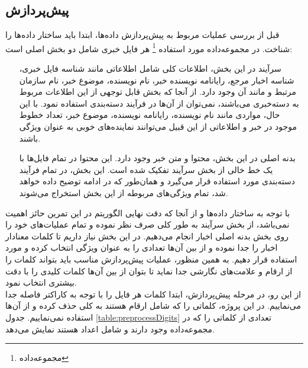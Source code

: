 \documentclass[11.5pt,a4paper]{article}
\begin{document}
\subsection{پیش‌پردازش}
قبل از بررسی عملیات مربوط به پیش‌پردازش داده‌ها،‌ ابتدا باید ساختار داده‌ها را شناخت. در مجموعه‌داده مورد استفاده
\footnote{مجموعه‌داده 
 }
 هر فایل خبری شامل دو بخش اصلی است:
\begin{itemize}
\item [سرآیند] 
در این بخش، اطلاعات کلی شامل اطلاعاتی مانند شناسه فایل خبری، شناسه اخبار مرجع، رایانامه نویسنده خبر، نام نویسنده،‌ موضوع خبر،‌ نام سازمان مرتبط و مانند آن وجود دارد. از آنجا که بخش قابل توجهی از این اطلاعات مربوط به دسته‌خبری می‌باشند، نمی‌توان از آن‌ها در فرآیند دسته‌بندی استفاده نمود. با این حال، مواردی مانند نام نویسنده، رایانامه نویسنده، موضوع خبر، تعداد خطوط موجود در خبر و اطلاعاتی از این قبیل می‌توانند نماینده‌های خوبی به عنوان ویژگی باشند.
\item [بدنه اصلی]
در این بخش، محتوا و متن خبر وجود دارد. این محتوا در تمام فایل‌ها با یک خط خالی از بخش سرآیند تفکیک شده است. این بخش، در تمام فرآیند دسته‌بندی مورد استفاده قرار می‌گیرد و همان‌طور که در ادامه توضیح داده خواهد شد، تمام ویژگی‌های مربوطه از این بخش استخراج می‌شوند.
\end{itemize}

با توجه به ساختار داده‌ها و از آنجا که دقت نهایی الگوریتم در این تمرین حائز اهمیت نمی‌باشد،‌ از بخش سرآیند به طور کلی صرف نظر نموده و تمام عملیات‌های خود را روی بخش بدنه اصلی اخبار انجام می‌دهیم. در این بخش نیاز داریم تا کلمات معنادار اخبار را جدا نموده و از بین آن‌ها تعدادی را به عنوان ویژگی انتخاب کرده و مورد استفاده قرار دهیم. به همین منظور، عملیات پیش‌پردازش مناسب باید بتواند کلمات را از ارقام و علامت‌های نگارشی جدا نماید تا بتوان از بین آن‌ها کلمات کلیدی را با دقت بیشتری انتخاب نمود.\\
از این رو، در مرحله پیش‌پردازش، ابتدا کلمات هر فایل را با توجه به کاراکتر فاصله جدا می‌نماییم. در این پروژه، کلماتی را که شامل ارقام هستند به کلی حذف کرده و از آن‌ها استفاده نمی‌نماییم. جدول \ref{table:preprocessDigits} تعدادی از کلماتی را که در مجموعه‌داده وجود دارند و شامل اعداد هستند نمایش می‌دهد.
\end{document}
